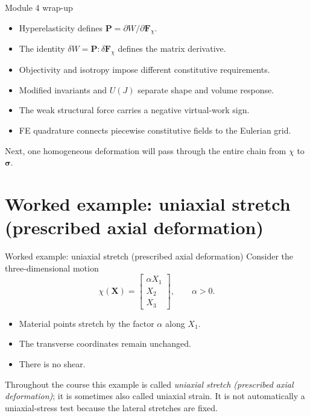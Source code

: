 \documentclass[aspectratio=169,11pt]{beamer}
\newcommand{\X}{\bm{X}}
\newcommand{\Fdef}{\bm{F}_{\chi}}
\newcommand{\sigmaC}{\bm{\sigma}}
\newcommand{\Pten}{\bm{P}}
\begin{document}
\begin{frame}{Module 4 wrap-up}
\begin{itemize}\itemsep6pt
  \item Hyperelasticity defines \(\Pten=\partial W/\partial\Fdef\).
  \item The identity \(\delta W=\Pten:\delta\Fdef\) defines the matrix derivative.
  \item Objectivity and isotropy impose different constitutive requirements.
  \item Modified invariants and \(U(J)\) separate shape and volume response.
  \item The weak structural force carries a negative virtual-work sign.
  \item FE quadrature connects piecewise constitutive fields to the Eulerian grid.
\end{itemize}
\medskip
\begin{punchbox}
\small
Next, one homogeneous deformation will pass through the entire chain from \(\chi\) to \(\sigmaC\).
\end{punchbox}
\end{frame}

\section{Worked example: uniaxial stretch (prescribed axial deformation)}

\begin{frame}{Worked example: uniaxial stretch (prescribed axial deformation)}
Consider the three-dimensional motion
\[
  \chi(\X)
  =
  \begin{bmatrix}
    \alpha X_1\\
    X_2\\
    X_3
  \end{bmatrix},
  \qquad
  \alpha>0.
\]
\begin{itemize}\itemsep6pt
  \item Material points stretch by the factor \(\alpha\) along \(X_1\).
  \item The transverse coordinates remain unchanged.
  \item There is no shear.
\end{itemize}
\medskip
\begin{punchbox}
\small
Throughout the course this example is called \emph{uniaxial stretch (prescribed axial deformation)}; it is sometimes also called uniaxial strain. It is not automatically a uniaxial-stress test because the lateral stretches are fixed.
\end{punchbox}
\end{frame}
\end{document}
